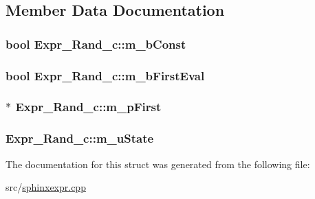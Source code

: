 \subsection{Member Data Documentation}
\hypertarget{structExpr__Rand__c_a960e035bc5774d108efab27a9ba232d6}{
\subsubsection[{m\-\_\-b\-Const}]{\setlength{\rightskip}{0pt plus 5cm}bool Expr\-\_\-\-Rand\-\_\-c\-::m\-\_\-b\-Const}}\label{structExpr__Rand__c_a960e035bc5774d108efab27a9ba232d6}
\hypertarget{structExpr__Rand__c_acab181ff97c8c3e344296e10b9c561b1}{
\subsubsection[{m\-\_\-b\-First\-Eval}]{\setlength{\rightskip}{0pt plus 5cm}bool Expr\-\_\-\-Rand\-\_\-c\-::m\-\_\-b\-First\-Eval\hspace{0.3cm}{\ttfamily [mutable]}}}\label{structExpr__Rand__c_acab181ff97c8c3e344296e10b9c561b1}
\hypertarget{structExpr__Rand__c_a485ed6ed4aac2f34807e8619e3f33aa7}{
\subsubsection[{m\-\_\-p\-First}]{$\ast$ Expr\-\_\-\-Rand\-\_\-c\-::m\-\_\-p\-First}}\label{structExpr__Rand__c_a485ed6ed4aac2f34807e8619e3f33aa7}
\hypertarget{structExpr__Rand__c_a1d6d9f632c8d979d77bcb645afb885a3}{
\subsubsection[{m\-\_\-u\-State}]{ Expr\-\_\-\-Rand\-\_\-c\-::m\-\_\-u\-State\hspace{0.3cm}{\ttfamily [mutable]}}}\label{structExpr__Rand__c_a1d6d9f632c8d979d77bcb645afb885a3}


The documentation for this struct was generated from the following file\-:\begin{DoxyCompactItemize}
\item 
src/\hyperlink{sphinxexpr_8cpp}{sphinxexpr.\-cpp}\end{DoxyCompactItemize}

